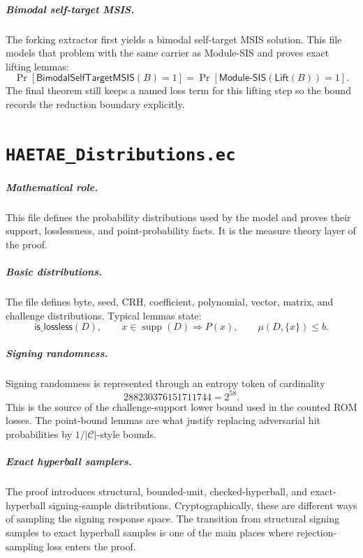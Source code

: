 \documentclass[11pt]{report}
\newcommand{\ecchapter}[2]{\chapter{\texorpdfstring{\texttt{#1}}{#2}}}
\newcommand{\MSIS}{\mathsf{Module\mbox{-}SIS}}
\newcommand{\BMSIS}{\mathsf{BimodalSelfTargetMSIS}}
\theoremstyle{definition}
\theoremstyle{plain}
\theoremstyle{definition}
\begin{document}
\paragraph{Bimodal self-target MSIS.}
The forking extractor first yields a bimodal self-target MSIS solution.  This
file models that problem with the same carrier as Module-SIS and proves exact
lifting lemmas:
\[
  \Pr[\BMSIS(B)=1]
  =
  \Pr[\MSIS(\mathsf{Lift}(B))=1].
\]
The final theorem still keeps a named loss term for this lifting step so the
bound records the reduction boundary explicitly.



\ecchapter{HAETAE\_Distributions.ec}{HAETAE Distributions.ec}

\paragraph{Mathematical role.}
This file defines the probability distributions used by the model and proves
their support, losslessness, and point-probability facts.  It is the measure
theory layer of the proof.

\paragraph{Basic distributions.}
The file defines byte, seed, CRH, coefficient, polynomial, vector, matrix, and
challenge distributions.  Typical lemmas state:
\[
  \mathsf{is\_lossless}(D),\qquad
  x\in\operatorname{supp}(D)\Rightarrow P(x),\qquad
  \mu(D,\{x\})\le b.
\]

\paragraph{Signing randomness.}
Signing randomness is represented through an entropy token of cardinality
\[
  288230376151711744 = 2^{58}.
\]
This is the source of the challenge-support lower bound used in the counted
ROM losses.  The point-bound lemmas are what justify replacing adversarial hit
probabilities by \(1/|\mathcal{C}|\)-style bounds.

\paragraph{Exact hyperball samplers.}
The proof introduces structural, bounded-unit, checked-hyperball, and
exact-hyperball signing-sample distributions.  Cryptographically, these are
different ways of sampling the signing response space.  The transition from
structural signing samples to exact hyperball samples is one of the main places
where rejection-sampling loss enters the proof.
\end{document}
